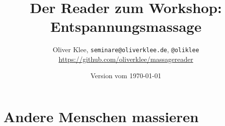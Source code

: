 \documentclass[a4paper,twoside,11pt,titlepage,openany]{scrbook}
\author{Oliver Klee, \texttt{seminare@oliverklee.de}, \texttt{@oliklee}\\\url{https://github.com/oliverklee/massagereader}}
\title{Der Reader zum Workshop: Entspannungsmassage}
\date{Version vom \today}
\begin{document}
\nocite*{}

\maketitle
\frontmatter





\tableofcontents

\mainmatter



\chapter{Andere Menschen massieren}









\backmatter

\end{document}
